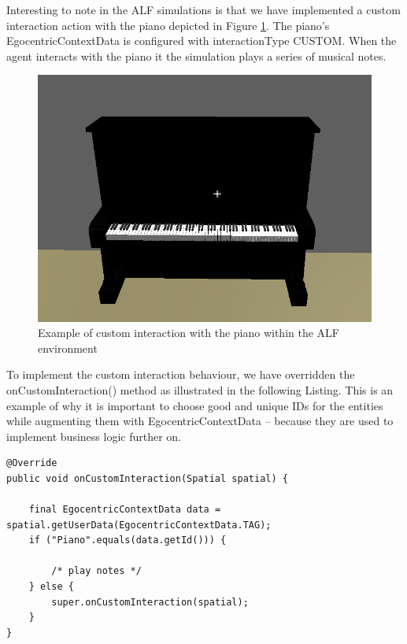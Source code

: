 Interesting to note in the ALF simulations is that we have implemented a custom interaction action with the piano depicted in Figure \ref{fig:impl_piano}. The piano's EgocentricContextData is configured with interactionType CUSTOM. When the agent interacts with the piano it the simulation plays a series of musical notes.
\begin{figure}[H]
	\centering
	\includegraphics[width=0.8\linewidth]{gfx/Chapter4/piano}
	\caption{Example of custom interaction with the piano within the ALF environment}
	\label{fig:impl_piano}
\end{figure}

To implement the custom interaction behaviour, we have overridden the onCustomInteraction() method as illustrated in the following Listing. This is an example of why it is important to choose good and unique IDs for the entities while augmenting them with EgocentricContextData -- because they are used to implement business logic further on.
\begin{lstlisting}
@Override
public void onCustomInteraction(Spatial spatial) {
    
    final EgocentricContextData data = spatial.getUserData(EgocentricContextData.TAG);
    if ("Piano".equals(data.getId())) {
        
        /* play notes */
    } else {
        super.onCustomInteraction(spatial);
    }
}
\end{lstlisting}

